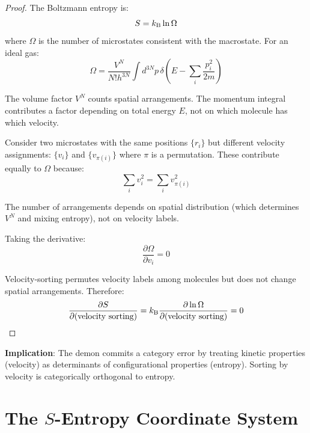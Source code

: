 \begin{proof}
The Boltzmann entropy is:
\begin{equation}
S = k_{\mathrm{B}} \ln \Omega
\end{equation}
where $\Omega$ is the number of microstates consistent with the macrostate. For an ideal gas:
\begin{equation}
\Omega = \frac{V^N}{N! h^{3N}} \int d^{3N}p \, \delta\left(E - \sum_i \frac{p_i^2}{2m}\right)
\end{equation}

The volume factor $V^N$ counts spatial arrangements. The momentum integral contributes a factor depending on total energy $E$, not on which molecule has which velocity.

Consider two microstates with the same positions $\{r_i\}$ but different velocity assignments: $\{v_i\}$ and $\{v_{\pi(i)}\}$ where $\pi$ is a permutation. These contribute equally to $\Omega$ because:
\begin{equation}
\sum_i v_i^2 = \sum_i v_{\pi(i)}^2
\end{equation}

The number of arrangements depends on spatial distribution (which determines $V^N$ and mixing entropy), not on velocity labels.

Taking the derivative:
\begin{equation}
\frac{\partial \Omega}{\partial v_i} = 0
\end{equation}

Velocity-sorting permutes velocity labels among molecules but does not change spatial arrangements. Therefore:
\begin{equation}
\frac{\partial S}{\partial (\text{velocity sorting})} = k_{\mathrm{B}} \frac{\partial \ln \Omega}{\partial (\text{velocity sorting})} = 0
\end{equation}
\end{proof}

\textbf{Implication}: The demon commits a category error by treating kinetic properties (velocity) as determinants of configurational properties (entropy). Sorting by velocity is categorically orthogonal to entropy.

\section{The $S$-Entropy Coordinate System}
\label{sec:sentropy}

